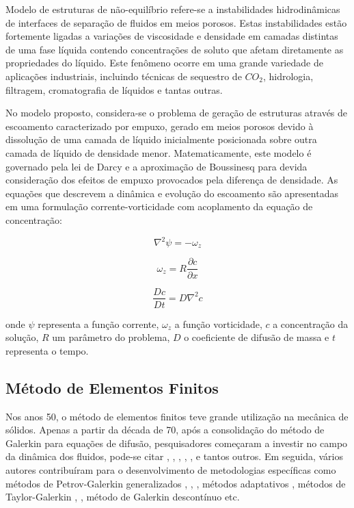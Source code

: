 \documentclass[a4paper,portuges,12pt]{article}
\begin{document}
Modelo de estruturas de não-equilíbrio refere-se a instabilidades
hidrodinâmicas de interfaces de separação de fluidos em meios porosos.
Estas instabilidades estão fortemente ligadas a variações de viscosidade e
densidade em camadas distintas de uma fase líquida contendo
concentrações de soluto que afetam diretamente as propriedades do
líquido. Este fenômeno ocorre em uma grande variedade de aplicações
industriais, incluindo técnicas de sequestro de $CO_2$, hidrologia,
filtragem, cromatografia de líquidos e tantas outras. 

No modelo proposto, considera-se o problema de geração de estruturas
através de escoamento caracterizado por empuxo, gerado em meios porosos
devido à dissolução de uma camada de líquido inicialmente posicionada
sobre outra camada de líquido de densidade menor. Matematicamente, este
modelo é governado pela lei de Darcy e a aproximação de Boussinesq para
devida consideração dos efeitos de empuxo provocados pela diferença de
densidade. As equações que descrevem a dinâmica e evolução do escoamento
são apresentadas em uma formulação corrente-vorticidade com acoplamento
da equação de concentração:

\begin{equation}
	\nabla^2 \psi = -\omega_z
\label{eq:chem1}
\end{equation}

\begin{equation}
	\omega_z = R \frac{\partial c}{\partial x}
\label{eq:chem2}
\end{equation}

\begin{equation}
	\frac{D c}{D t} = D \nabla^2 c
\label{eq:chem3}
\end{equation}\vspace{0.5cm}

\noindent onde $\psi$ representa a função corrente, $\omega_z$ a função
vorticidade, $c$ a concentração da solução, $R$ um parâmetro do
problema, $D$ o coeficiente de difusão de massa e $t$ representa o
tempo.

\subsection{Método de Elementos Finitos}

Nos anos 50, o método de elementos finitos teve grande utilização na
mecânica de sólidos.  Apenas a partir da década de 70, após a
consolidação do método de Galerkin para equações de difusão,
pesquisadores começaram a investir no campo da dinâmica dos fluidos,
pode-se citar \cite{zienkiewicz1965}, \cite{oden1972}, \cite{oden1998},
\cite{chung1978}, \cite{hughes1982}, \cite{pironneau1989} e tantos
outros.  Em seguida, vários autores contribuíram para o desenvolvimento
de metodologias específicas como métodos de Petrov-Galerkin
generalizados \cite{heinrich1977}, \cite{hughes1986},
\cite{johnson1987}, métodos adaptativos \cite{oden1989}, métodos de
Taylor-Galerkin \cite{donea1984}, \cite{lohner1985}, método de Galerkin
descontínuo \cite{oden1998} etc.
\end{document}
